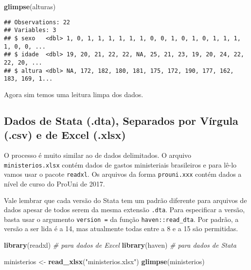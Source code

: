 \documentclass[
]{article}
\newenvironment{Shaded}{\begin{snugshade}}{\end{snugshade}}
\newcommand{\CommentTok}[1]{\textcolor[rgb]{0.56,0.35,0.01}{\textit{#1}}}
\newcommand{\KeywordTok}[1]{\textcolor[rgb]{0.13,0.29,0.53}{\textbf{#1}}}
\newcommand{\NormalTok}[1]{#1}
\newcommand{\StringTok}[1]{\textcolor[rgb]{0.31,0.60,0.02}{#1}}
\begin{document}
\begin{Shaded}
\begin{Highlighting}[]
\KeywordTok{glimpse}\NormalTok{(alturas)}
\end{Highlighting}
\end{Shaded}

\begin{verbatim}
## Observations: 22
## Variables: 3
## $ sexo   <dbl> 1, 0, 1, 1, 1, 1, 1, 1, 0, 0, 1, 0, 1, 0, 1, 1, 1, 1, 0, 0, ...
## $ idade  <dbl> 19, 20, 21, 22, 22, NA, 25, 21, 23, 19, 20, 24, 22, 22, 20, ...
## $ altura <dbl> NA, 172, 182, 180, 181, 175, 172, 190, 177, 162, 183, 169, 1...
\end{verbatim}

Agora sim temos uma leitura limpa dos dados.

\hypertarget{dados-de-stata-.dta-separados-por-vuxedrgula-.csv-e-de-excel-.xlsx}{%
\subsection{Dados de Stata (.dta), Separados por Vírgula (.csv) e de
Excel
(.xlsx)}\label{dados-de-stata-.dta-separados-por-vuxedrgula-.csv-e-de-excel-.xlsx}}

O processo é muito similar ao de dados delimitados. O arquivo
\texttt{ministerios.xlsx} contém dados de gastos ministeriais
brasileiros e para lê-lo vamos usar o pacote \texttt{readxl}. Os
arquivos da forma \texttt{prouni.xxx} contém dados a nível de curso do
ProUni de 2017.

Vale lembrar que cada versão do Stata tem um padrão diferente para
arquivos de dados apesar de todos serem da mesma extensão \texttt{.dta}.
Para especificar a versão, basta usar o argumento \texttt{version\ =} da
função \texttt{haven::read\_dta}. Por padrão, a versão a ser lida é a
14, mas atualmente todas entre a 8 e a 15 são permitidas.

\begin{Shaded}
\begin{Highlighting}[]
\KeywordTok{library}\NormalTok{(readxl) }\CommentTok{# para dados de Excel}
\KeywordTok{library}\NormalTok{(haven) }\CommentTok{# para dados de Stata}

\NormalTok{ministerios <-}\StringTok{ }\KeywordTok{read_xlsx}\NormalTok{(}\StringTok{"ministerios.xlsx"}\NormalTok{)}
\KeywordTok{glimpse}\NormalTok{(ministerios)}
\end{Highlighting}
\end{Shaded}
\end{document}
